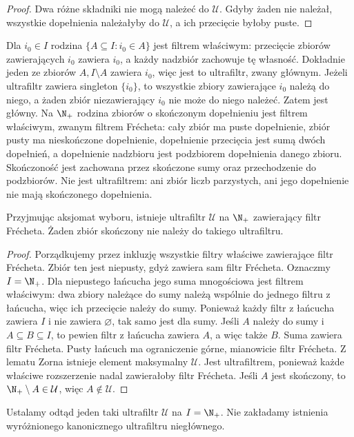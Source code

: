 \begin{proof}
Dwa różne składniki nie mogą należeć do $\mathcal U$. Gdyby żaden nie należał, wszystkie dopełnienia należałyby do $\mathcal U$, a ich przecięcie byłoby puste.
\end{proof}
\begin{przyklad}
Dla $i_0\in I$ rodzina $\{A\subseteq I:i_0\in A\}$ jest filtrem właściwym: przecięcie zbiorów zawierających $i_0$ zawiera $i_0$, a każdy nadzbiór zachowuje tę własność. Dokładnie jeden ze zbiorów $A,I\setminus A$ zawiera $i_0$, więc jest to ultrafiltr, zwany głównym. Jeżeli ultrafiltr zawiera singleton $\{i_0\}$, to wszystkie zbiory zawierające $i_0$ należą do niego, a żaden zbiór niezawierający $i_0$ nie może do niego należeć. Zatem jest główny. Na $\N_+$ rodzina zbiorów o skończonym dopełnieniu jest filtrem właściwym, zwanym filtrem Frécheta: cały zbiór ma puste dopełnienie, zbiór pusty ma nieskończone dopełnienie, dopełnienie przecięcia jest sumą dwóch dopełnień, a dopełnienie nadzbioru jest podzbiorem dopełnienia danego zbioru. Skończoność jest zachowana przez skończone sumy oraz przechodzenie do podzbiorów. Nie jest ultrafiltrem: ani zbiór liczb parzystych, ani jego dopełnienie nie mają skończonego dopełnienia.
\end{przyklad}
\begin{twierdzenie}
\label{ma1:thm:free-ultrafilter}
Przyjmując aksjomat wyboru, istnieje ultrafiltr $\mathcal U$ na $\N_+$ zawierający filtr Frécheta. Żaden zbiór skończony nie należy do takiego ultrafiltru.
\end{twierdzenie}
\begin{proof}
Porządkujemy przez inkluzję wszystkie filtry właściwe zawierające filtr Frécheta. Zbiór ten jest niepusty, gdyż zawiera sam filtr Frécheta. Oznaczmy $I=\N_+$. Dla niepustego łańcucha jego suma mnogościowa jest filtrem właściwym: dwa zbiory należące do sumy należą wspólnie do jednego filtru z łańcucha, więc ich przecięcie należy do sumy. Ponieważ każdy filtr z łańcucha zawiera $I$ i nie zawiera $\varnothing$, tak samo jest dla sumy. Jeśli $A$ należy do sumy i $A\subseteq B\subseteq I$, to pewien filtr z łańcucha zawiera $A$, a więc także $B$. Suma zawiera filtr Frécheta. Pusty łańcuch ma ograniczenie górne, mianowicie filtr Frécheta. Z lematu Zorna istnieje element maksymalny $\mathcal U$. Jest ultrafiltrem, ponieważ każde właściwe rozszerzenie nadal zawierałoby filtr Frécheta. Jeśli $A$ jest skończony, to $\N_+\setminus A\in\mathcal U$, więc $A\notin\mathcal U$.
\end{proof}
Ustalamy odtąd jeden taki ultrafiltr $\mathcal U$ na $I=\N_+$. Nie zakładamy istnienia wyróżnionego kanonicznego ultrafiltru niegłównego.

